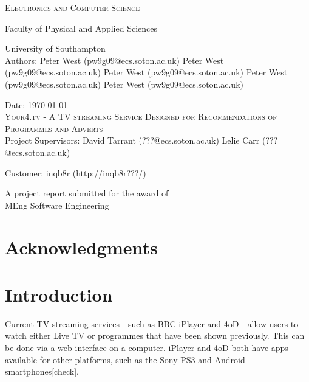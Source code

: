 \documentclass[12pt,a4paper,twoside, titlepage, openright, cleardoublepage=empty]{article}
\begin{document}


\begin{titlepage}

\begin{center}

\textsc{\large{Electronics and Computer Science}}

\large{Faculty of Physical and Applied Sciences}

\large{University of Southampton}\\[3.5cm]

\large{Authors: Peter West (pw9g09@ecs.soton.ac.uk)
		Peter West (pw9g09@ecs.soton.ac.uk)
		Peter West (pw9g09@ecs.soton.ac.uk)
		Peter West (pw9g09@ecs.soton.ac.uk)
		Peter West (pw9g09@ecs.soton.ac.uk)}

\large{Date: \today}\\[4.0cm]

\textsc{\LARGE Your4.tv - A TV streaming Service Designed for Recommendations of Programmes and Adverts}\\[4.5cm]

\large{Project Supervisors: David Tarrant (???@ecs.soton.ac.uk)
		Lelie Carr (???@ecs.soton.ac.uk)}

\large{Customer: inqb8r (http://inqb8r???/)}

\vfill

\large{A project report submitted for the award of}\\[0.0cm]

\large{MEng Software Engineering}

\end{center}

\end{titlepage}


\cleardoublepage

\abstract{}

\cleardoublepage

\section{Acknowledgments}

\cleardoublepage
\setcounter{tocdepth}{2}
\tableofcontents
\newpage
\cleardoublepage
\setcounter{page}{0}
\cleardoublepage

\section{Introduction}
Current TV streaming services - such as BBC iPlayer and 4oD - allow users to watch either Live TV or programmes that have been shown previously. This can be done via a web-interface on a computer. iPlayer and 4oD both have apps available for other platforms, such as the Sony PS3 and Android smartphones[check].
\end{document}
